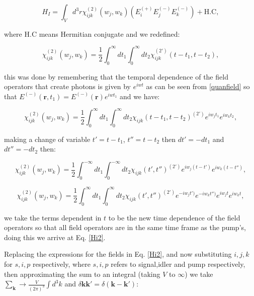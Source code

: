\documentclass{book}
\begin{document}
\begin{equation}
H_{I}=\int_{V} d^{3}r \chi_{ijk}^{(2)}(w_{j},w_{k}) (E_{i}^{(+)}E_{j}^{(-)}E_{k}^{(-)})+\mathrm{H.C}, \label{Hi2}
\end{equation}

where  $\mathrm{H.C}$ means Hermitian conjugate and we redefined:

\begin{equation}
\chi_{ijk}^{(2)}(w_{j},w_{k})=\frac{1}{2}\int_{0}^{\infty}dt_{1}\int_{0}^{\infty}dt_{2} \chi_{ijk}^{(2')}(t-t_{1},t-t_{2}),
\end{equation}

this was done by remembering that the temporal dependence of the field operators that create photons is given by $e^{iwt}$ as can be seen from \ref{quanfield} so that $E^{(-)}(\mathbf{r},t_{1})=E^{(-)}(\mathbf{r})e^{iwt_{1}}$ and we have:

\begin{equation}
\chi_{ijk}^{(2)}(w_{j},w_{k})=\frac{1}{2}\int_{0}^{\infty}dt_{1}\int_{0}^{\infty}dt_{2} \chi_{ijk}(t-t_{1},t-t_{2})^{(2')} e^{i w_{j} t_{1}} e^{i w_{k} t_{2}},
\end{equation}

making a change of variable $t'=t-t_{1}$, $t''=t-t_{2}$ then $dt'=-dt_{1}$ and $dt''=-dt_{2}$ then:

\begin{equation}
\chi_{ijk}^{(2)}(w_{j},w_{k})=\frac{1}{2}\int_{0}^{-\infty}dt_{1}\int_{0}^{-\infty}dt_{2} \chi_{ijk}(t',t'')^{(2')} e^{iw_{j}(t-t')} e^{i w_{k} (t-t'')},
\end{equation}

\begin{equation}
\chi_{ijk}^{(2)}(w_{j},w_{k})=\frac{1}{2}\int_{0}^{\infty}dt_{1}\int_{0}^{\infty}dt_{2} \chi_{ijk}(t',t'')^{(2')} e^{-iw_{j}t')} e^{-iw_{k}t'')} e^{iw_{j}t} e^{iw_{k}t},
\end{equation}

we take the terms dependent in $t$ to be the new time dependence of the field operators so that all field operators are in the same time frame as the pump's, doing this we arrive at Eq. \ref{Hi2}.

Replacing the expressions for the fields in Eq. \ref{Hi2}, and now substituting $i,j,k$ for $s,i,p$ respectively, where $s,i,p$ refers to signal,idler and pump respectively, then approximating the sum to an integral (taking $V$ to $\infty$) we take $\sum_{\textbf{k}}\xrightarrow{}\frac{V}{(2\pi)^{3}}\int d^{3}k$ and $\delta \mathbf{k} \mathbf{k}' =\delta(\mathbf{k}-\mathbf{k}')$:
\end{document}
